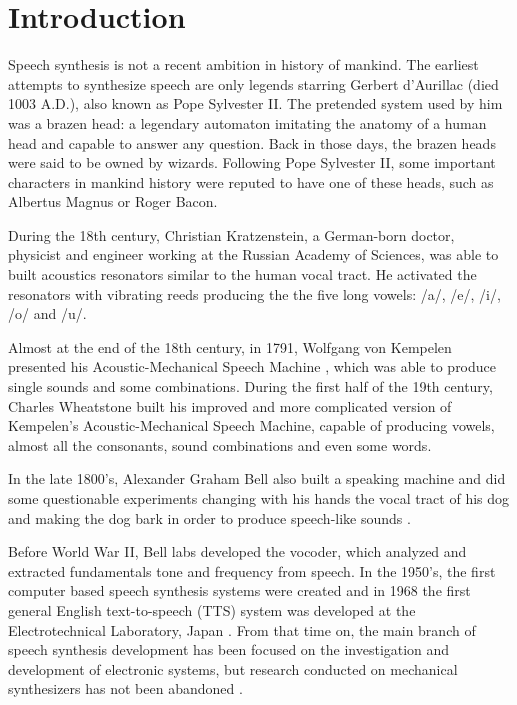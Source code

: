 \section{Introduction}
\label{intro}
\thispagestyle{empty}

Speech synthesis is not a recent ambition in history of mankind. The earliest attempts to synthesize speech are only legends starring Gerbert d'Aurillac (died 1003 A.D.), also known as Pope Sylvester II. The pretended system used by him was a brazen head: a legendary automaton imitating the anatomy of a human head and capable to answer any question. Back in those days, the brazen heads were said to be owned by wizards. Following Pope Sylvester II, some important characters in mankind history  were reputed to have one of these heads, such as Albertus Magnus or Roger Bacon.

During the 18th century, Christian Kratzenstein, a German-born doctor, physicist and engineer working at the Russian Academy of Sciences, was able to built acoustics resonators similar to the human vocal tract. He activated the resonators with vibrating reeds producing the the five long vowels: /a/, /e/, /i/, /o/ and /u/.

Almost at the end of the 18th century, in 1791, Wolfgang von Kempelen presented his Acoustic-Mechanical Speech Machine \cite{vonKempelen}, which was able to produce single sounds and some combinations. During the first half of the 19th century, Charles Wheatstone built his improved and more complicated version of Kempelen's Acoustic-Mechanical Speech Machine, capable of producing vowels, almost all the consonants, sound combinations and even some words.	

In the late 1800's, Alexander Graham Bell also built a speaking machine and did some questionable experiments changing with his hands the vocal tract of his dog and making the dog bark in order to produce speech-like sounds \cite{Schroeder93, LemmettyMSc}.

Before World War II, Bell labs developed the vocoder, which analyzed and extracted fundamentals tone and frequency from speech. In the 1950's, the first computer based speech synthesis systems were created and in 1968 the first general English text-to-speech (TTS) system was developed at the Electrotechnical Laboratory, Japan \cite{Klatt87}. From that time on, the main branch of speech synthesis development has been focused on the investigation and development of electronic systems, but research conducted on mechanical synthesizers has not been abandoned \cite{mechSynthWeb, mechSynth}.


